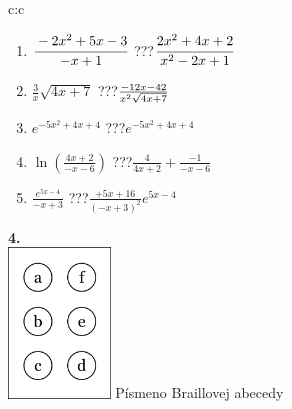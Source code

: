 \documentclass[10pt]{report}
\begin{document}
\begin{tabular}{c:c}
\begin{minipage}[c][104.5mm][t]{0.5\linewidth}
\begin{center}
\begin{minipage}{0.79\linewidth}
\begin{center}
\begin{varwidth}{\linewidth}
\begin{enumerate}
\item $\cfrac{-2x^2+5x-3}{-x+1}$\quad \dotfill\; ???\;\dotfill \quad $\cfrac{2x^2+4x+2}{x^2-2x+1}$
\item $\frac{3}{x}\sqrt{4x+7}$\quad \dotfill\; ???\;\dotfill \quad $\frac{-12x-42}{x^2 \sqrt{\smash[b]{4x+7}}}$
\item $e^{-5x^2+4x+4}$\quad \dotfill\; ???\;\dotfill \quad $e^{-5x^2+4x+4}$
\item $\ln{\left(\frac{4x+2}{-x-6}\right)}$\quad \dotfill\; ???\;\dotfill \quad $\frac{4}{4x+2}+\frac{-1}{-x-6}$
\item $\frac{e^{5x-4}}{-x+3}$\quad \dotfill\; ???\;\dotfill \quad $\frac{+5x+16}{(-x+3)^2}e^{5x-4}$
\end{enumerate}
\end{varwidth}
\end{center}
\end{minipage}
\begin{minipage}{0.20\linewidth}
\begin{center}
{\Huge\bfseries 4.} \\[2mm]
\includegraphics[height=40mm]{../images/braille.png}
{\small Písmeno Braillovej abecedy}
\end{center}
\end{minipage}
\end{center}
\end{minipage}
%
\end{tabular}
\newpage
\thispagestyle{empty}
\end{document}
